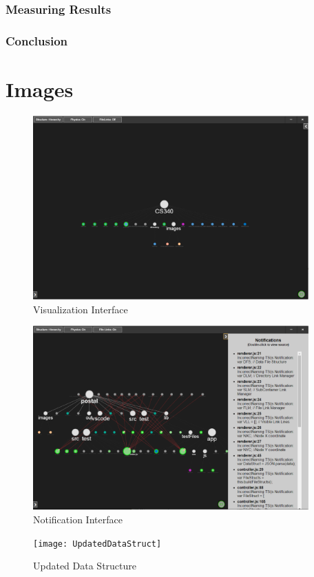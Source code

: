 \documentclass[letterpaper,10pt,titlepage,draftclsnofoot,onecolumn,onesided] {IEEEtran}
\begin{document}
	\subsubsection{Measuring Results}
	
	\subsubsection{Conclusion}
	


\pagebreak	
\section{Images}
	\begin{figure}
		\includegraphics[width=400px]{PostalUI}
		\caption{Visualization Interface}  
	\end{figure}
	
	\begin{figure}
		\includegraphics[width=400px]{PostalNotification}
		\caption{Notification Interface}  
	\end{figure}
	
	\begin{figure}
		\texttt{[image: UpdatedDataStruct]}
		\caption{Updated Data Structure}
	\end{figure}
\end{document}
